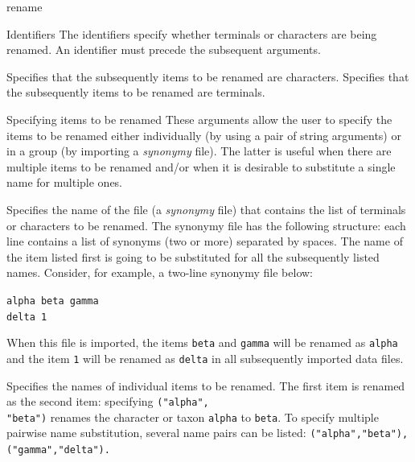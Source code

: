 \begin{command}{rename}{}
    \begin{arguments}
        \begin{argumentgroup}{Identifiers}
            {The identifiers specify whether terminals or characters are being
            renamed. An identifier must precede the subsequent arguments.}
        
                {Specifies that the subsequently items to be renamed are characters.} 
                {}
                {Specifies that the subsequently items to be renamed are terminals.} 
                {}
        \end{argumentgroup}
          
        \begin{argumentgroup}{Specifying items to be renamed}
          {These arguments allow the user to specify the items to be renamed either individually (by 
          using a pair of string arguments) or in a group (by importing a \emph{synonymy} file).
          The latter is useful when there are multiple items to be renamed and/or when it is
          desirable to substitute a single name for  multiple ones.}
          
                {Specifies the name of the file (a \emph{synonymy} file) that contains the list of
                terminals or characters to be renamed. The synonymy file has the following structure:
                each line contains a list of synonyms (two or more) separated by spaces. The name of the
                item listed first is going to be substituted for all the subsequently listed names. Consider,
                for example, a two-line synonymy file below:
                
                \texttt{alpha beta gamma \\
                delta 1\\}
                 
                When this file is imported, the items \texttt{beta} and \texttt{gamma} will be
                renamed as \texttt{alpha} and the item \texttt{1} will be renamed as \texttt{delta}
                in all subsequently imported data files.}
                {}

                {Specifies the names of individual items to be renamed. The first item is renamed
                as the second item: specifying \texttt{("alpha",\\"beta")} renames the character or taxon
                \texttt{alpha} to \texttt{beta}. To specify multiple pairwise name substitution, several 
                name pairs can be listed: \texttt{("alpha","beta"),("gamma","delta").}}
                {}
                

\end{argumentgroup}
\end{arguments}
\end{command}
